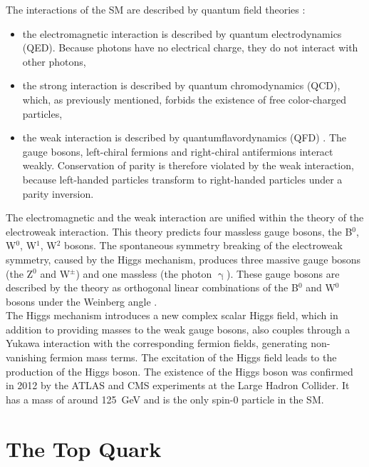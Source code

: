The interactions of the SM are described by quantum field theories \cite{welsch}:
\begin{itemize}
\item the electromagnetic interaction is described by quantum electrodynamics (QED). Because photons have no electrical charge, they do not interact with other photons,
\item the strong interaction is described by quantum chromodynamics (QCD), which, as previously mentioned, forbids the existence of free color-charged particles,
\item the weak interaction is described by quantumflavordynamics (QFD) \cite{griffiths}. The gauge bosons, left-chiral fermions and right-chiral antifermions interact weakly. Conservation of parity is therefore violated by the weak interaction, because left-handed particles transform to right-handed particles under a parity inversion.
\end{itemize}

The electromagnetic and the weak interaction are unified within the theory of the electroweak interaction. This theory predicts four massless gauge bosons, the B$^{0}$, W$^{0}$, W$^{1}$, W$^{2}$ bosons. The spontaneous symmetry breaking of the electroweak symmetry, caused by the Higgs mechanism, produces three massive gauge bosons (the Z$^0$ and W$^{\pm}$) and one massless (the photon $\upgamma$). These gauge bosons are described by the theory as orthogonal linear combinations of the B$^{0}$ and W$^{0}$ bosons under the Weinberg angle \cite{wiki:electroweak}.\\

The Higgs mechanism introduces a new complex scalar Higgs field, which in addition to providing masses to the weak gauge bosons, also couples through a Yukawa interaction with the corresponding fermion fields, generating non-vanishing fermion mass terms. The excitation of the Higgs field leads to the production of the Higgs boson. The existence of the Higgs boson was confirmed in 2012 by the ATLAS and CMS experiments at the Large Hadron Collider. It has a mass of around \SI{125}{\giga\eV} \cite{chatrchyan} and is the only spin-0 particle in the SM.

\section{The Top Quark}
\label{sec:theory_top}
